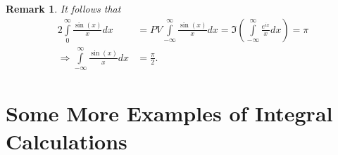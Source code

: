 \documentclass[12pt, a4paper]{article}
\theoremstyle{plain}
\newtheorem{rem}{Remark}
\theoremstyle{definition}
\begin{document}
			\begin{rem}
				It follows that
				\begin{align*}
					2\int\limits_{0}^{\infty}\frac{\sin(x)}{x}dx &=
					PV\int\limits_{-\infty}^{\infty}\frac{\sin(x)}{x}dx =
					\Im\left(\int\limits_{-\infty}^{\infty}\frac{e^{ix}}{x}dx\right) = \pi\\
					\Rightarrow \int\limits_{-\infty}^{\infty}\frac{\sin(x)}{x}dx &= \frac{\pi}{2}.
				\end{align*}
			\end{rem}
	\section{Some More Examples of Integral Calculations} %
	\label{sec:some_more_examples_of_integral_calculations}
\end{document}
